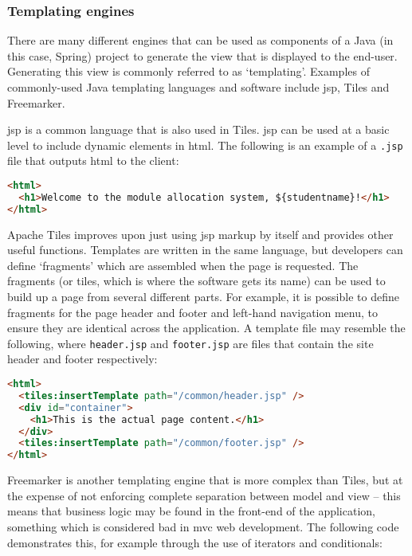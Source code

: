 \subsubsection{Templating engines}

There are many different engines that can be used as components of a Java (in
this case, Spring) project to generate the view that is displayed to the
end-user. Generating this view is commonly referred to as `templating'.
Examples of commonly-used Java templating languages and software include
\gls{jsp}, Tiles and Freemarker.


\gls{jsp} is a common language that is also used in Tiles. \gls{jsp} can be
used at a basic level to include dynamic elements in \gls{html}. The following
is an example of a \texttt{.jsp} file that outputs \gls{html} to the client:

\begin{lstlisting}[language=HTML]
<html>
  <h1>Welcome to the module allocation system, ${studentname}!</h1>
</html>
\end{lstlisting}


Apache Tiles improves upon just using \gls{jsp} markup by itself and provides
other useful functions. Templates are written in the same language, but
developers can define `fragments' which are assembled when the page is
requested. The fragments (or tiles, which is where the software gets its name)
can be used to build up a page from several different parts. For example, it
is possible to define fragments for the page header and footer and left-hand
navigation menu, to ensure they are identical across the application. A
template file may resemble the following, where \texttt{header.jsp} and
\texttt{footer.jsp} are files that contain the site header and footer
respectively:

\begin{lstlisting}[language=HTML]
<html>
  <tiles:insertTemplate path="/common/header.jsp" />
  <div id="container">
    <h1>This is the actual page content.</h1>
  </div>
  <tiles:insertTemplate path="/common/footer.jsp" />
</html>
\end{lstlisting}


Freemarker is another templating engine that is more complex than Tiles, but
at the expense of not enforcing complete separation between model and view --
this means that business logic may be found in the front-end of the
application, something which is considered bad in \gls{mvc} web development.
The following code demonstrates this, for example through the use of iterators
and conditionals:

